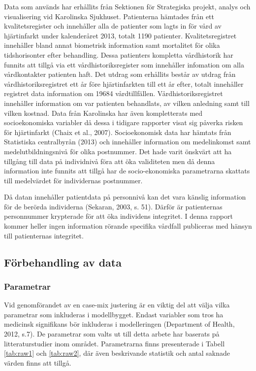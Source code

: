 Data som används har erhållits från Sektionen för Strategiska projekt, analys och visualisering vid Karolinska Sjukhuset. Patienterna hämtades från ett kvalitetsregister och innehåller alla de patienter som lagts in för vård av hjärtinfarkt under kalenderåret 2013, totalt 1190 patienter. Kvalitetsregistret innehåller bland annat biometrisk information samt mortalitet för olika tidshorisonter efter behandling. Dessa patienters kompletta vårdhistorik har funnits att tillgå via ett vårdhistoriksregister som innehåller infomation om alla vårdkontakter patienten haft. Det utdrag som erhållits består av utdrag från vårdhistoriksregistret ett år före hjärtinfarkten till ett år efter, totalt innehåller registret data information om 19684 vårdtillfällen. Vårdhistoriksregistret innehåller information om var patienten behandlats, av vilken anledning samt till vilken kostnad. Data från Karolinska har även kompletterats med socioekonomiska variabler då dessa i tidigare rapporter visat sig påverka risken för hjärtinfarkt (Chaix et al., 2007). Socioekonomisk data har hämtats från Statistiska centralbyrån (2013) och innehåller information om medelinkomst samt medelutbildningsnivå för olika postnummer. Det hade varit önskvärt att ha tillgång till data på individnivå föra att öka validiteten men då denna information inte funnits att tillgå har de socio-ekonomiska parametrarna skattats till medelvärdet för individernas postnummer.

Då datan innehåller patientdata på personnivå kan det vara känslig information för de berörda individerna (Sekaran, 2003, s. 51). Därför är patienternas personnummer krypterade för att öka individens integritet. I denna rapport kommer heller ingen information rörande specifika vårdfall publiceras med hänsyn till patienternas integritet.

\subsection{Förbehandling av data}

\subsubsection{Parametrar}


Vid genomförandet av en case-mix justering är en viktig del att välja vilka parametrar som inkluderas i modellbygget. Endast variabler som tros ha medicinsk signifikans bör inkluderas i modelleringen (Department of Health, 2012, s.7). De parametrar som valts ut till detta arbete har baserats på litteraturstudier inom området. Parametrarna finns presenterade i Tabell \ref{tab:raw1} och \ref{tab:raw2}, där även beskrivande statistik och antal saknade värden finns att tillgå.

